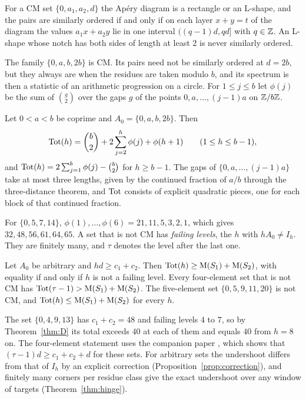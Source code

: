 \begin{maintheorem}\label{thm:B}
For a CM set $\{0,a_1,a_2,d\}$ the Ap\'ery diagram is a rectangle or an L-shape, and the pairs are similarly ordered if and only if on each layer $x+y=t$ of the diagram the values $a_1x+a_2y$ lie in one interval $((q-1)d,qd]$ with $q\in\mathbb{Z}$. An L-shape whose notch has both sides of length at least $2$ is never similarly ordered.
\end{maintheorem}

The family $\{0,a,b,2b\}$ is CM. Its pairs need not be similarly ordered at $d=2b$, but they always are when the residues are taken modulo $b$, and its spectrum is then a statistic of an arithmetic progression on a circle. For $1\le j\le b$ let $\phi(j)$ be the sum of $\binom g2$ over the gaps $g$ of the points $0,a,\dots,(j-1)a$ on $\mathbb{Z}/b\mathbb{Z}$.

\begin{maintheorem}\label{thm:C}
Let $0<a<b$ be coprime and $A_0=\{0,a,b,2b\}$. Then
\[
\operatorname{Tot}(h)=\binom b2+2\sum_{j=2}^{h}\phi(j)+\phi(h+1)\qquad(1\le h\le b-1),
\]
and $\operatorname{Tot}(h)=2\sum_{j=1}^b\phi(j)-\binom b2$ for $h\ge b-1$. The gaps of $\{0,a,\dots,(j-1)a\}$ take at most three lengths, given by the continued fraction of $a/b$ through the three-distance theorem, and $\operatorname{Tot}$ consists of explicit quadratic pieces, one for each block of that continued fraction.
\end{maintheorem}

For $\{0,5,7,14\}$, $\phi(1),\dots,\phi(6)=21,11,5,3,2,1$, which gives $32,48,56,61,64,65$. A set that is not CM has \emph{failing levels}, the $h$ with $hA_0\neq I_h$. They are finitely many, and $\tau$ denotes the level after the last one.

\begin{maintheorem}\label{thm:D}
Let $A_0$ be arbitrary and $hd\ge c_1+c_2$. Then $\operatorname{Tot}(h)\ge\operatorname{M}(S_1)+\operatorname{M}(S_2)$, with equality if and only if $h$ is not a failing level. Every four-element set that is not CM has $\operatorname{Tot}(\tau-1)>\operatorname{M}(S_1)+\operatorname{M}(S_2)$. The five-element set $\{0,5,9,11,20\}$ is not CM, and $\operatorname{Tot}(h)\le\operatorname{M}(S_1)+\operatorname{M}(S_2)$ for every $h$.
\end{maintheorem}

The set $\{0,4,9,13\}$ has $c_1+c_2=48$ and failing levels $4$ to $7$, so by Theorem~\ref{thm:D} its total exceeds $40$ at each of them and equals $40$ from $h=8$ on. The four-element statement uses the companion paper \cite[Theorem~A]{CompanionRegularity}, which shows that $(\tau-1)d\ge c_1+c_2+d$ for these sets. For arbitrary sets the undershoot differs from that of $I_h$ by an explicit correction (Proposition~\ref{prop:correction}), and finitely many corners per residue class give the exact undershoot over any window of targets (Theorem~\ref{thm:hinge}).

